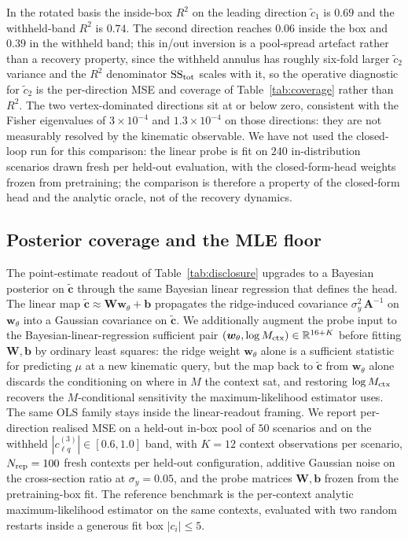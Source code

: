 \documentclass[11pt,a4paper]{article}
\begin{document}
In the rotated basis the inside-box $R^2$ on the leading direction $\tilde{c}_1$ is $0.69$ and the withheld-band $R^2$ is $0.74$. The second direction reaches $0.06$ inside the box and $0.39$ in the withheld band; this in/out inversion is a pool-spread artefact rather than a recovery property, since the withheld annulus has roughly six-fold larger $\tilde{c}_2$ variance and the $R^2$ denominator ${\rm SS}_{\rm tot}$ scales with it, so the operative diagnostic for $\tilde{c}_2$ is the per-direction MSE and coverage of Table~\ref{tab:coverage} rather than $R^2$. The two vertex-dominated directions sit at or below zero, consistent with the Fisher eigenvalues of $3 \times 10^{-4}$ and $1.3 \times 10^{-4}$ on those directions: they are not measurably resolved by the kinematic observable. We have not used the closed-loop run for this comparison: the linear probe is fit on $240$ in-distribution scenarios drawn fresh per held-out evaluation, with the closed-form-head weights frozen from pretraining; the comparison is therefore a property of the closed-form head and the analytic oracle, not of the recovery dynamics.

\subsection{Posterior coverage and the MLE floor}
\label{sec:disclosure-bcrb}

The point-estimate readout of Table~\ref{tab:disclosure} upgrades to a Bayesian posterior on $\tilde{\bm{c}}$ through the same Bayesian linear regression that defines the head. The linear map $\tilde{\bm{c}} \approx \bm{W}\bm{w}_\theta + \bm{b}$ propagates the ridge-induced covariance $\sigma_y^2\,\bm{A}^{-1}$ on $\bm{w}_\theta$ into a Gaussian covariance on $\tilde{\bm{c}}$. We additionally augment the probe input to the Bayesian-linear-regression sufficient pair $(\bm{w}_\theta, \log M_{\rm ctx}) \in \mathbb{R}^{16+K}$ before fitting $\bm{W}, \bm{b}$ by ordinary least squares: the ridge weight $\bm{w}_\theta$ alone is a sufficient statistic for predicting $\mu$ at a new kinematic query, but the map back to $\tilde{\bm{c}}$ from $\bm{w}_\theta$ alone discards the conditioning on where in $M$ the context sat, and restoring $\log M_{\rm ctx}$ recovers the $M$-conditional sensitivity the maximum-likelihood estimator uses. The same OLS family stays inside the linear-readout framing. We report per-direction realised MSE on a held-out in-box pool of $50$ scenarios and on the withheld $|c_{\ell q}^{(3)}| \in [0.6,1.0]$ band, with $K = 12$ context observations per scenario, $N_{\rm rep} = 100$ fresh contexts per held-out configuration, additive Gaussian noise on the cross-section ratio at $\sigma_y = 0.05$, and the probe matrices $\bm{W}, \bm{b}$ frozen from the pretraining-box fit. The reference benchmark is the per-context analytic maximum-likelihood estimator on the same contexts, evaluated with two random restarts inside a generous fit box $|c_i| \leq 5$.
\end{document}
